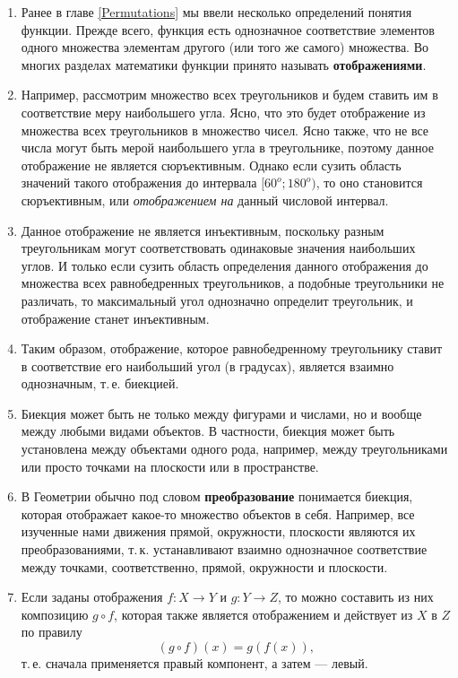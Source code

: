 \begin{enumerate}
\item Ранее в главе \ref{Permutations} мы ввели несколько определений понятия функции. Прежде всего, функция есть однозначное соответствие элементов одного множества элементам другого (или того же самого) множества. Во многих разделах математики функции принято называть \textbf{отображениями}.
\item Например, рассмотрим множество всех треугольников и будем ставить им в соответствие меру наибольшего угла. Ясно, что это будет отображение из множества всех треугольников в множество чисел. Ясно также, что не все числа могут быть мерой наибольшего угла в треугольнике, поэтому данное отображение не является сюръективным. Однако если сузить область значений такого отображения до интервала $[60^o;180^o)$, то оно становится сюръективным, или \textit{отображением на} данный числовой интервал.
\item Данное отображение не является инъективным, поскольку разным треугольникам могут соответствовать одинаковые значения наибольших углов. И только если сузить область определения данного отображения до множества всех равнобедренных треугольников, а подобные треугольники не различать, то максимальный угол однозначно определит треугольник, и отображение станет инъективным.
\item Таким образом, отображение, которое равнобедренному треугольнику ставит в соответствие его наибольший угол (в градусах), является взаимно однозначным, т.\,е. биекцией.
\item Биекция может быть не только между фигурами и числами, но и вообще между любыми видами объектов. В частности, биекция может быть установлена между объектами одного рода, например, между треугольниками или просто точками на плоскости или в пространстве.
\item В Геометрии обычно под словом \textbf{преобразование} понимается биекция, которая отображает какое-то множество объектов в себя. Например, все изученные нами движения прямой, окружности, плоскости являются их преобразованиями, т.\,к. устанавливают взаимно однозначное соответствие между точками, соответственно, прямой, окружности и плоскости.
\item Если заданы отображения $f:X\to Y$ и $g:Y\to Z$, то можно составить из них композицию $g\circ f$, которая также является отображением и действует из $X$ в $Z$ по правилу
$$
(g\circ f)(x)=g(f(x)),
$$
т.\,е. сначала применяется правый компонент, а затем --- левый.

\end{enumerate}
